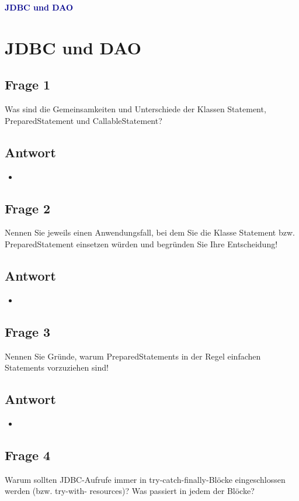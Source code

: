 \textbf{\textcolor{darkblue}{ JDBC und DAO}}~

\section*{JDBC und DAO}
\subsection*{Frage 1}
Was sind die Gemeinsamkeiten und Unterschiede der Klassen Statement, PreparedStatement und CallableStatement?
\subsection*{Antwort}
\begin{itemize}
	\item 
\end{itemize}

\subsection*{Frage 2}
Nennen Sie jeweils einen Anwendungsfall, bei dem Sie die Klasse Statement bzw. PreparedStatement einsetzen würden und begründen Sie Ihre Entscheidung!
\subsection*{Antwort}
\begin{itemize}
	\item 
\end{itemize}

\subsection*{Frage 3}
Nennen Sie Gründe, warum PreparedStatements in der Regel einfachen Statements vorzuziehen sind!
\subsection*{Antwort}
\begin{itemize}
	\item 
\end{itemize}

\subsection*{Frage 4}
Warum sollten JDBC-Aufrufe immer in try-catch-finally-Blöcke eingeschlossen werden (bzw. try-with- resources)? Was passiert in jedem der Blöcke?
